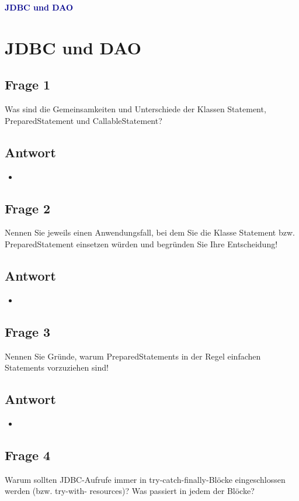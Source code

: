 \textbf{\textcolor{darkblue}{ JDBC und DAO}}~

\section*{JDBC und DAO}
\subsection*{Frage 1}
Was sind die Gemeinsamkeiten und Unterschiede der Klassen Statement, PreparedStatement und CallableStatement?
\subsection*{Antwort}
\begin{itemize}
	\item 
\end{itemize}

\subsection*{Frage 2}
Nennen Sie jeweils einen Anwendungsfall, bei dem Sie die Klasse Statement bzw. PreparedStatement einsetzen würden und begründen Sie Ihre Entscheidung!
\subsection*{Antwort}
\begin{itemize}
	\item 
\end{itemize}

\subsection*{Frage 3}
Nennen Sie Gründe, warum PreparedStatements in der Regel einfachen Statements vorzuziehen sind!
\subsection*{Antwort}
\begin{itemize}
	\item 
\end{itemize}

\subsection*{Frage 4}
Warum sollten JDBC-Aufrufe immer in try-catch-finally-Blöcke eingeschlossen werden (bzw. try-with- resources)? Was passiert in jedem der Blöcke?
